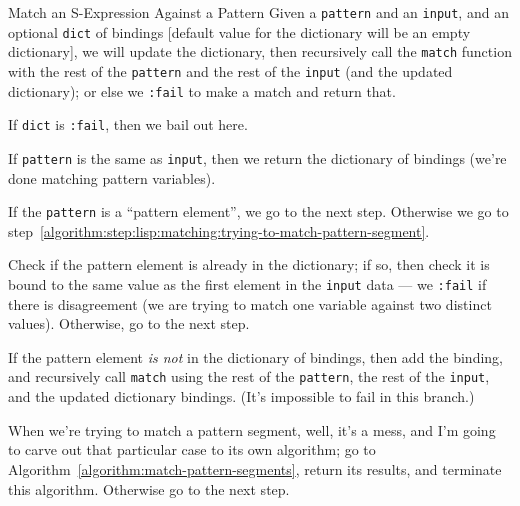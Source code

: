\begin{algorithm}{Match an S-Expression Against a Pattern}\label{algorithm:pattern-match-sexpr}
Given a \lstinline[language=lisp]{pattern} and an
\lstinline[language=lisp]{input}, and an optional
\lstinline[language=lisp]{dict} of bindings [default value for the
  dictionary will be an empty dictionary], we will update the
dictionary, then recursively call the
\lstinline[language=lisp]{match} function with
the rest of the \lstinline[language=lisp]{pattern} and the rest of the
\lstinline[language=lisp]{input} (and the updated dictionary); or else
we \lstinline[language=lisp]{:fail} to make a match and return that.\setcounter{algorithmstep}{-1}

 If \lstinline[language=lisp]{dict} is
\lstinline[language=lisp]{:fail}, then we bail out here.

 If
\lstinline[language=lisp]{pattern} is the same as
\lstinline[language=lisp]{input}, then we return the dictionary of
bindings (we're done matching pattern variables).

 If the \lstinline[language=lisp]{pattern} is a ``pattern
element'', we go to the next step. Otherwise we go to step~\ref{algorithm:step:lisp:matching:trying-to-match-pattern-segment}.

Check if the pattern element is already in the dictionary; if so, then
check it is bound to the same value as the first element in the
\lstinline[language=lisp]{input} data --- we
\lstinline[language=lisp]{:fail} if there is disagreement (we are trying
to match one variable against two distinct values). Otherwise, go to the
next step.

If the pattern element \emph{is not} in the dictionary of bindings, then
add the binding, and recursively call \lstinline[language=lisp]{match}
using the rest of the \lstinline[language=lisp]{pattern},
the rest of the \lstinline[language=lisp]{input}, and the updated
dictionary bindings. (It's impossible to fail in this branch.)

\label{algorithm:step:lisp:matching:trying-to-match-pattern-segment}
When we're trying to match a pattern segment, well, it's a mess, and I'm
going to carve out that particular case to its own algorithm;
go to Algorithm~\ref{algorithm:match-pattern-segments}, return its
results, and terminate this algorithm. Otherwise go to the next step.


\end{algorithm}
